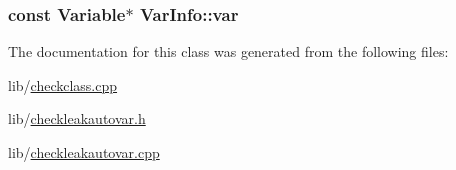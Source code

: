\hypertarget{struct_var_info_a68f990f51837a325f0bfd4f5a3949544}{
\subsubsection[{var}]{\setlength{\rightskip}{0pt plus 5cm}const {\bf Variable}$\ast$ Var\-Info\-::var}}\label{struct_var_info_a68f990f51837a325f0bfd4f5a3949544}


The documentation for this class was generated from the following files\-:\begin{DoxyCompactItemize}
\item 
lib/\hyperlink{checkclass_8cpp}{checkclass.\-cpp}\item 
lib/\hyperlink{checkleakautovar_8h}{checkleakautovar.\-h}\item 
lib/\hyperlink{checkleakautovar_8cpp}{checkleakautovar.\-cpp}\end{DoxyCompactItemize}
